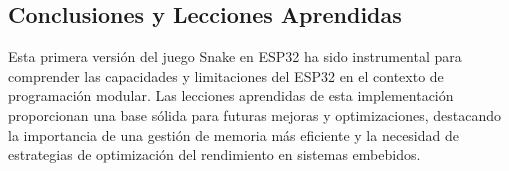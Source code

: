 \subsection{Conclusiones y Lecciones Aprendidas}

Esta primera versión del juego Snake en ESP32 ha sido instrumental para comprender las capacidades y limitaciones del ESP32 en el contexto de programación modular. Las lecciones aprendidas de esta implementación proporcionan una base sólida para futuras mejoras y optimizaciones, destacando la importancia de una gestión de memoria más eficiente y la necesidad de estrategias de optimización del rendimiento en sistemas embebidos.

